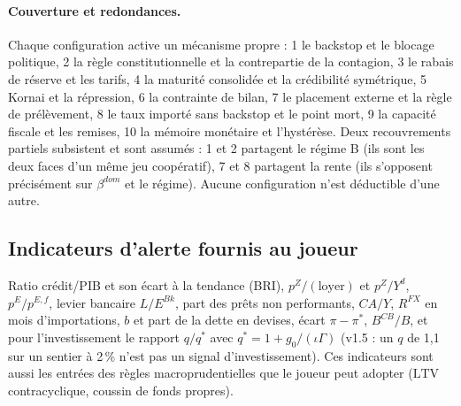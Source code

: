 \documentclass[11pt,a4paper]{article}
\begin{document}
\paragraph{Couverture et redondances.} Chaque configuration active un mécanisme propre : 1 le backstop et le blocage politique, 2 la règle constitutionnelle et la contrepartie de la contagion, 3 le rabais de réserve et les tarifs, 4 la maturité consolidée et la crédibilité symétrique, 5 Kornai et la répression, 6 la contrainte de bilan, 7 le placement externe et la règle de prélèvement, 8 le taux importé sans backstop et le point mort, 9 la capacité fiscale et les remises, 10 la mémoire monétaire et l'hystérèse. Deux recouvrements partiels subsistent et sont assumés : 1 et 2 partagent le régime B (ils sont les deux faces d'un même jeu coopératif), 7 et 8 partagent la rente (ils s'opposent précisément sur $\beta^{dom}$ et le régime). Aucune configuration n'est déductible d'une autre.

\subsection{Indicateurs d'alerte fournis au joueur}
Ratio crédit/PIB et son écart à la tendance (BRI), $p^Z/(\text{loyer})$ et $p^Z/Y^d$, $p^E/p^{E,f}$, levier bancaire $L/E^{Bk}$, part des prêts non performants, $CA/Y$, $R^{FX}$ en mois d'importations, $b$ et part de la dette en devises, écart $\pi - \pi^\ast$, $B^{CB}/B$, et pour l'investissement le rapport $q/q^\ast$ avec $q^\ast=1+g_0/(\iota\Gamma)$ (v1.5 : un $q$ de 1,1 sur un sentier à 2\,\% n'est pas un signal d'investissement). Ces indicateurs sont aussi les entrées des règles macroprudentielles que le joueur peut adopter ($\mathrm{LTV}$ contracyclique, coussin de fonds propres).

\end{document}
